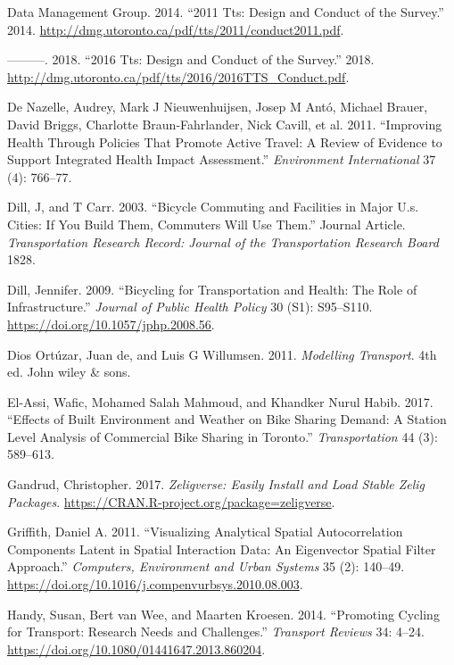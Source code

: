 \documentclass[smallextended]{svjour3}       %
\begin{document}
\leavevmode\hypertarget{ref-Dmg2014tts}{}%
Data Management Group. 2014. ``2011 Tts: Design and Conduct of the
Survey.'' 2014.
\url{http://dmg.utoronto.ca/pdf/tts/2011/conduct2011.pdf}.

\leavevmode\hypertarget{ref-Dmg2018tts}{}%
---------. 2018. ``2016 Tts: Design and Conduct of the Survey.'' 2018.
\url{http://dmg.utoronto.ca/pdf/tts/2016/2016TTS_Conduct.pdf}.

\leavevmode\hypertarget{ref-deNazelle2011}{}%
De Nazelle, Audrey, Mark J Nieuwenhuijsen, Josep M Antó, Michael Brauer,
David Briggs, Charlotte Braun-Fahrlander, Nick Cavill, et al. 2011.
``Improving Health Through Policies That Promote Active Travel: A Review
of Evidence to Support Integrated Health Impact Assessment.''
\emph{Environment International} 37 (4): 766--77.

\leavevmode\hypertarget{ref-Dill2003}{}%
Dill, J, and T Carr. 2003. ``Bicycle Commuting and Facilities in Major
U.s. Cities: If You Build Them, Commuters Will Use Them.'' Journal
Article. \emph{Transportation Research Record: Journal of the
Transportation Research Board} 1828.

\leavevmode\hypertarget{ref-Dill2009}{}%
Dill, Jennifer. 2009. ``Bicycling for Transportation and Health: The
Role of Infrastructure.'' \emph{Journal of Public Health Policy} 30
(S1): S95--S110. \url{https://doi.org/10.1057/jphp.2008.56}.

\leavevmode\hypertarget{ref-deDios2011Modelling}{}%
Dios Ortúzar, Juan de, and Luis G Willumsen. 2011. \emph{Modelling
Transport}. 4th ed. John wiley \& sons.

\leavevmode\hypertarget{ref-elAssi2017effects}{}%
El-Assi, Wafic, Mohamed Salah Mahmoud, and Khandker Nurul Habib. 2017.
``Effects of Built Environment and Weather on Bike Sharing Demand: A
Station Level Analysis of Commercial Bike Sharing in Toronto.''
\emph{Transportation} 44 (3): 589--613.

\leavevmode\hypertarget{ref-Gandrud2017}{}%
Gandrud, Christopher. 2017. \emph{Zeligverse: Easily Install and Load
Stable Zelig Packages}.
\url{https://CRAN.R-project.org/package=zeligverse}.

\leavevmode\hypertarget{ref-Griffith2011}{}%
Griffith, Daniel A. 2011. ``Visualizing Analytical Spatial
Autocorrelation Components Latent in Spatial Interaction Data: An
Eigenvector Spatial Filter Approach.'' \emph{Computers, Environment and
Urban Systems} 35 (2): 140--49.
\url{https://doi.org/10.1016/j.compenvurbsys.2010.08.003}.

\leavevmode\hypertarget{ref-handyPromotingCyclingTransport2014}{}%
Handy, Susan, Bert van Wee, and Maarten Kroesen. 2014. ``Promoting
Cycling for Transport: Research Needs and Challenges.'' \emph{Transport
Reviews} 34: 4--24. \url{https://doi.org/10.1080/01441647.2013.860204}.
\end{document}
